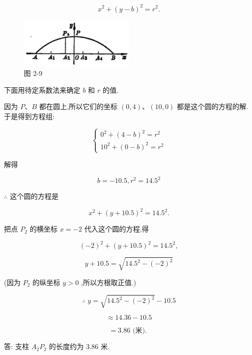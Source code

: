 \documentclass[lang=cn,newtx,10pt,scheme=chinese]{elegantbook}
\begin{document}
\[
    {x}^{2} + {\left( y - b\right) }^{2} = {r}^{2}.
\]

\begin{figure}[h]
  \centering
  \includegraphics[max width=0.5\textwidth]{images/01912cc2-ffb6-728e-9ae7-b113ff05c64b_80_540621.jpg}
  \caption{图 2-9}
\end{figure}



下面用待定系数法来确定 \(b\) 和 \(r\) 的值.

因为 \(P\text{、}B\) 都在圆上,所以它们的坐标 \(\left( {0,4}\right) \text{、}\left( {{10},0}\right)\) 都是这个圆的方程的解. 于是得到方程组:

\[
  \left\{ \begin{array}{l} {0}^{2} + {\left( 4 - b\right) }^{2} = {r}^{2} \\ {10}^{2} + {\left( 0 - b\right) }^{2} = {r}^{2} \end{array}\right.
\]

解得

\[
  b = - {10.5},{r}^{2} = {14.5}^{2}
\]

\(\therefore\) 这个圆的方程是

\[
    {x}^{2} + {\left( y + {10.5}\right) }^{2} = {14.5}^{2}.
\]

把点 \({P}_{2}\) 的横坐标 \(x = - 2\) 代入这个圆的方程,得

\[
    {\left( -2\right) }^{2} + {\left( y + {10.5}\right) }^{2} = {14.5}^{2},
\]

\[
  y + {10.5} = \sqrt{{14.5}^{2} - {\left( -2\right) }^{2}}
\]

(因为 \({P}_{2}\) 的纵坐标 \(y > 0\) ,所以方根取正值.)

\[
  \therefore \;y = \sqrt{{14.5}^{2} - {\left( -2\right) }^{2}} - {10.5}
\]

\[
  \approx {14.36} - {10.5}
\]

\[
  = {3.86}\text{ (米). }
\]

答: 支柱 \({A}_{2}{P}_{2}\) 的长度约为 3.86 米.
\end{document}
